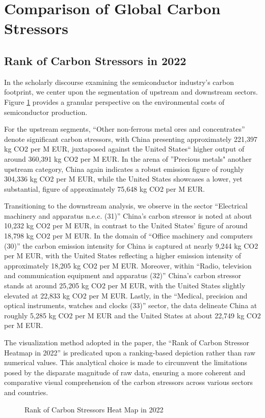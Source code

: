 \section{Comparison of Global Carbon Stressors}
\subsection{Rank of Carbon Stressors in 2022}
In the scholarly discourse examining the semiconductor industry's carbon footprint, we center upon the segmentation of upstream and downstream sectors. Figure \ref{fig:Rank of Carbon Stressor Heatmap in 2022} provides a granular perspective on the environmental costs of semiconductor production.

For the upstream segments, ``Other non-ferrous metal ores and concentrates'' denote significant carbon stressors, with China presenting approximately 221,397 kg CO2 per M EUR, juxtaposed against the United States`` higher output of around 360,391 kg CO2 per M EUR. In the arena of ''Precious metals" another upstream category, China again indicates a robust emission figure of roughly 304,336 kg CO2 per M EUR, while the United States showcases a lower, yet substantial, figure of approximately 75,648 kg CO2 per M EUR.

Transitioning to the downstream analysis, we observe in the sector ``Electrical machinery and apparatus n.e.c. (31)'' China's carbon stressor is noted at about 10,232 kg CO2 per M EUR, in contrast to the United States' figure of around 18,798 kg CO2 per M EUR. In the domain of ``Office machinery and computers (30)'' the carbon emission intensity for China is captured at nearly 9,244 kg CO2 per M EUR, with the United States reflecting a higher emission intensity of approximately 18,205 kg CO2 per M EUR. Moreover, within ``Radio, television and communication equipment and apparatus (32)'' China's carbon stressor stands at around 25,205 kg CO2 per M EUR, with the United States slightly elevated at 22,833 kg CO2 per M EUR. Lastly, in the ``Medical, precision and optical instruments, watches and clocks (33)'' sector, the data delineate China at roughly 5,285 kg CO2 per M EUR and the United States at about 22,749 kg CO2 per M EUR.

The visualization method adopted in the paper, the ``Rank of Carbon Stressor Heatmap in 2022'' is predicated upon a ranking-based depiction rather than raw numerical values. This analytical choice is made to circumvent the limitations posed by the disparate magnitude of raw data, ensuring a more coherent and comparative visual comprehension of the carbon stressors across various sectors and countries.
\ifincludefigures 
\begin{figure}
 \centering
 \caption{Rank of Carbon Stressors Heat Map in 2022}\label{fig:Rank of Carbon Stressor Heatmap in 2022}
\end{figure}
\fi
